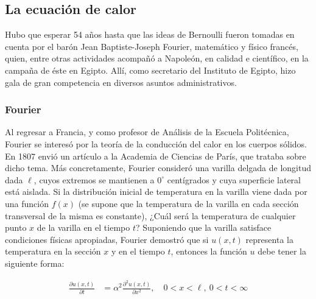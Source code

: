 \subsection{La ecuación de calor}
Hubo que esperar 54 años hasta que las ideas de Bernoulli fueron tomadas en cuenta por el barón Jean Baptiste-Joseph Fourier, matemático y físico francés, quien, entre otras actividades acompañó a Napoleón, en calidad e científico, en la campaña de éste en Egipto. Allí, como secretario del Instituto de Egipto, hizo gala de gran competencia en diversos asuntos administrativos. ~\cite{almira2017fourier}

\subsubsection{Fourier}
Al regresar a Francia, y como profesor de Análisis de la Escuela Politécnica, Fourier se interesó por la teoría de la conducción del calor en los cuerpos sólidos. En 1807 envió un artículo a la Academia de Ciencias de París, que trataba sobre dicho tema. Más concretamente, Fourier consideró una varilla delgada de longitud dada \( \ell \), cuyos extremos se mantienen a \( 0^\circ \) centígrados y cuya superficie lateral está aislada. Si la distribución inicial de temperatura en la varilla viene dada por una función \( f(x) \) (se supone que la temperatura de la varilla en cada sección transversal de la misma es constante), ¿Cuál será la temperatura de cualquier punto \( x \) de la varilla en el tiempo \( t \)? Suponiendo que la varilla satisface condiciones físicas apropiadas, Fourier demostró que si \( u(x,t) \) representa la temperatura en la sección \( x \) y en el tiempo \( t \), entonces la función \( u \) debe tener la siguiente forma:

\begin{equation} \label{eq12}
	\begin{split}
		\frac{\partial u(x,t)}{\partial t} &= \alpha^2 \frac{\partial^2 u(x,t)}{\partial x^2} , \quad 0 < x < \ell, \ 0 < t < \infty \\
	\end{split}
\end{equation}


